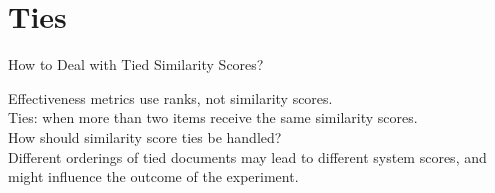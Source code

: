 \documentclass{beamer}
\begin{document}
\section{Ties}
\begin{frame}{How to Deal with Tied Similarity Scores?}

Effectiveness metrics use {\color{blue}ranks}, not {\color{blue}similarity scores}.\\[1.5em]

Ties: when more than two items receive the same similarity scores.\\[1.5em]

How should \alert{similarity score ties} be handled?\\[1.5em]

{\color{blue}Different orderings} of tied documents may lead to {\color{blue}different system scores}, and might influence the outcome of the experiment.
\end{frame}
\end{document}
